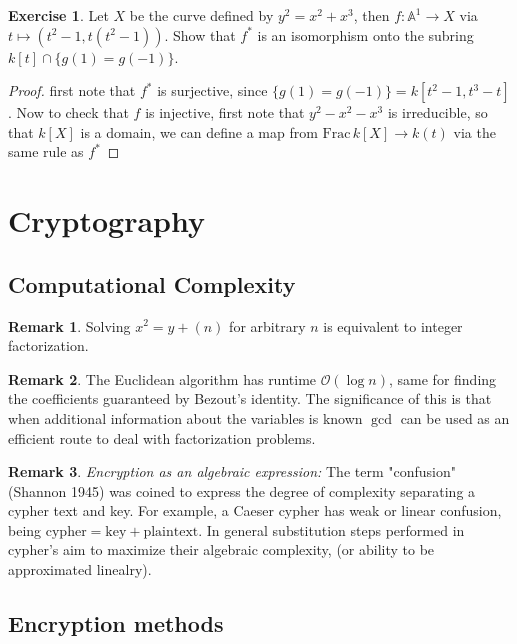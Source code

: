 \documentclass[11pt]{article}
\theoremstyle{definition}
\newtheorem*{rmk}{Remark}
\newtheorem{exe}{Exercise}
\newcommand{\set}[1]{\{#1\}}
\begin{document}
    \begin{exe}
        Let \(X\) be the curve defined by \(y^2 = x^2 + x^3\), then \(f: \mathbb{A}^1 \to X\) via \(t \mapsto (t^2 - 1,t(t^2 - 1))\). Show that \(f^*\) is an isomorphism onto the subring \(k[t]\cap \set{g(1) = g(-1)}\).
        \begin{proof}
            first note that \(f^*\) is surjective, since \(\set{g(1) = g(-1)} = k[t^2 - 1, t^3 - t]\). Now to check that \(f\) is injective, first note that \(y^2 - x^2 - x^3\) is irreducible, so that \(k[X]\) is a domain, we can define a map from \(\text{Frac}\,k[X] \to k(t)\) via the same rule as \(f^*\)
        \end{proof}
    \end{exe}


    \newpage
    \section{Cryptography}
    \subsection{Computational Complexity}
        \begin{rmk}
            Solving \(x^2 = y + (n)\) for arbitrary \(n\) is equivalent to integer factorization.
        \end{rmk}
        \begin{rmk}
            The Euclidean algorithm has runtime \(\mathcal{O}(\log n)\), same for finding the coefficients guaranteed by Bezout's identity. The significance of this is that when additional information about the variables is known \(\gcd\) can be used as an efficient route to deal with factorization problems.
        \end{rmk}
        \begin{rmk}
            \emph{Encryption as an algebraic expression:} The term "confusion" (Shannon 1945) was coined to express the degree of complexity separating a cypher text and key. For example, a Caeser cypher has weak or linear confusion, being \(\text{cypher} = \text{key} + \text{plaintext}\). In general substitution steps performed in cypher's aim to maximize their algebraic complexity, (or ability to be approximated linealry).
        \end{rmk}
    \subsection{Encryption methods}
\end{document}

